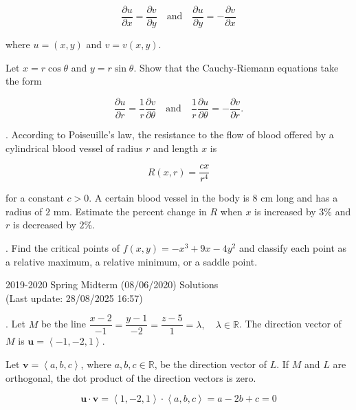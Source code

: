 \documentclass{article}
\begin{document}
\[\frac{\partial u}{\partial x}=\frac{\partial v}{\partial y}\quad\text{and}\quad\frac{\partial u}{\partial y}=-\frac{\partial v}{\partial x}\]

\hfill

\noindent where $u=(x,y)$ and $v=v(x,y)$.

\hfill

\noindent Let $x=r\cos\theta$ and $y=r\sin\theta$. Show that the Cauchy-Riemann equations take the form

\[\frac{\partial u}{\partial r} = \frac{1}{r} \frac{\partial v}{\partial\theta} \quad\text{and}\quad\frac1r\frac{\partial u}{\partial\theta}=-\frac{\partial v}{\partial r}.\]

\newpage

. According to Poiseuille’s law, the resistance to the flow of blood offered by a cylindrical blood vessel of radius $r$ and length $x$ is

\[R(x,r) = \frac{cx}{r^4}\]

\hfill

\noindent for a constant $c > 0$. A certain blood vessel in the body is 8 cm long and has a radius of $2$ mm. Estimate the percent change in $R$ when $x$ is increased by $3\%$ and $r$ is decreased by $2\%$.

\hfill

. Find the critical points of $f(x, y)=-x^3+9x-4y^2$ and classify each point as a relative maximum, a relative minimum, or a saddle point.

\newpage

\begin{center}
2019-2020 Spring Midterm (08/06/2020) Solutions\\
(Last update: 28/08/2025 16:57)
\end{center}

. Let $M$ be the line $\dfrac{x-2}{-1}=\dfrac{y-1}{-2}=\dfrac{z-5}{1}=\lambda,\quad\lambda\in\mathbb{R}$. The direction vector of $M$ is $\mathbf u=\left\langle-1,-2,1\right\rangle$.

\hfill

\noindent Let $\mathbf v=\left\langle a,b,c\right\rangle$, where $a,b,c\in\mathbb R$, be the direction vector of $L$. If $M$ and $L$ are orthogonal, the dot product of the direction vectors is zero.

\[\mathbf u\cdot\mathbf v=\left\langle1,-2,1\right\rangle\cdot\left\langle a,b,c\right\rangle=a-2b+c=0\]

\hfill
\end{document}
